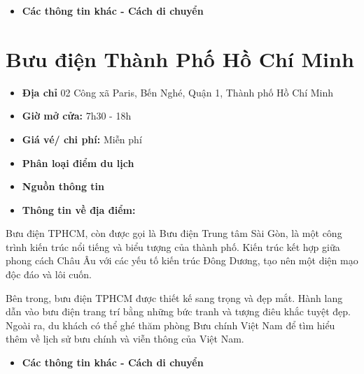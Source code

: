 \documentclass{article}
\begin{document}
\begin{itemize}
    \item{\textbf{Các thông tin khác - Cách di chuyển}}
\end{itemize}

\section{Bưu điện Thành Phố Hồ Chí Minh}
\begin{itemize}
    \item{\textbf{Địa chỉ}} 02 Công xã Paris, Bến Nghé, Quận 1, Thành phố Hồ Chí Minh
    \item{\textbf{Giờ mở cửa:}} 7h30 - 18h
    \item{\textbf{Giá vé/ chi phí:}} Miễn phí
    \item{\textbf{Phân loại điểm du lịch} }
    \item{\textbf{Nguồn thông tin}}
    \item{\textbf{Thông tin về địa điểm:}}
\end{itemize}
Bưu điện TPHCM, còn được gọi là Bưu điện Trung tâm Sài Gòn, là một công trình kiến trúc nổi tiếng và biểu tượng của thành phố. Kiến trúc kết hợp giữa phong cách Châu Âu với các yếu tố kiến trúc Đông Dương, tạo nên một diện mạo độc đáo và lôi cuốn.

Bên trong, bưu điện TPHCM được thiết kế sang trọng và đẹp mắt. Hành lang dẫn vào bưu điện trang trí bằng những bức tranh và tượng điêu khắc tuyệt đẹp. Ngoài ra, du khách có thể ghé thăm phòng Bưu chính Việt Nam để tìm hiểu thêm về lịch sử bưu chính và viễn thông của Việt Nam.

\begin{itemize}
    \item{\textbf{Các thông tin khác - Cách di chuyển}}
\end{itemize}
\end{document}
